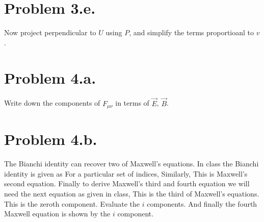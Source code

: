 \documentclass{article}
\begin{document}
\section*{Problem 3.e.}
Now project perpendicular to $U$ using $P$, and simplify the terms proportioanl to $v$.
\section*{Problem 4.a.}
Write down the components of $F_{\mu\nu}$ in terms of $\vec{E}$, $\vec{B}$.
\section*{Problem 4.b.}
The Bianchi identity can recover two of Maxwell's equations. In class the Bianchi identity is given as
For a particular set of indices,
Similarly,
This is Maxwell's second equation. Finally to derive Maxwell's third and fourth equation we will need the next equation as given in class,
This is the third of Maxwell's equations. This is the zeroth component. Evaluate the $i$ components.
And finally the fourth Maxwell equation is shown by the $i$ component.
\end{document}
